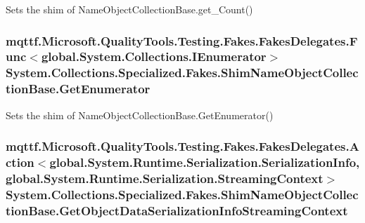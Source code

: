 Sets the shim of Name\-Object\-Collection\-Base.\-get\-\_\-\-Count()

\hypertarget{class_system_1_1_collections_1_1_specialized_1_1_fakes_1_1_shim_name_object_collection_base_ae1ccd97fd93cb3f84bd15c437eea1455}{
\subsubsection[{Get\-Enumerator}]{\setlength{\rightskip}{0pt plus 5cm}mqttf.\-Microsoft.\-Quality\-Tools.\-Testing.\-Fakes.\-Fakes\-Delegates.\-Func$<$global.\-System.\-Collections.\-I\-Enumerator$>$ System.\-Collections.\-Specialized.\-Fakes.\-Shim\-Name\-Object\-Collection\-Base.\-Get\-Enumerator\hspace{0.3cm}{\ttfamily [set]}}}\label{class_system_1_1_collections_1_1_specialized_1_1_fakes_1_1_shim_name_object_collection_base_ae1ccd97fd93cb3f84bd15c437eea1455}


Sets the shim of Name\-Object\-Collection\-Base.\-Get\-Enumerator()

\hypertarget{class_system_1_1_collections_1_1_specialized_1_1_fakes_1_1_shim_name_object_collection_base_a309ddda5bf9fab70f0deba19f4c90504}{
\subsubsection[{Get\-Object\-Data\-Serialization\-Info\-Streaming\-Context}]{\setlength{\rightskip}{0pt plus 5cm}mqttf.\-Microsoft.\-Quality\-Tools.\-Testing.\-Fakes.\-Fakes\-Delegates.\-Action$<$global.\-System.\-Runtime.\-Serialization.\-Serialization\-Info, global.\-System.\-Runtime.\-Serialization.\-Streaming\-Context$>$ System.\-Collections.\-Specialized.\-Fakes.\-Shim\-Name\-Object\-Collection\-Base.\-Get\-Object\-Data\-Serialization\-Info\-Streaming\-Context\hspace{0.3cm}{\ttfamily [set]}}}\label{class_system_1_1_collections_1_1_specialized_1_1_fakes_1_1_shim_name_object_collection_base_a309ddda5bf9fab70f0deba19f4c90504}


